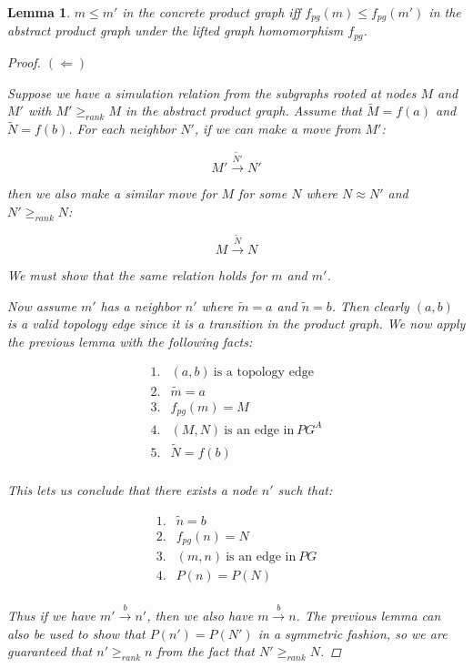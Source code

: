 \documentclass[twocolumn]{sig-alternate-10pt}
\newtheorem{lem}[thm]{Lemma}
\begin{document}
\begin{lem}
  $m \leq m'$ in the concrete product graph iff $f_{pg}(m) \leq f_{pg}(m')$ in the abstract product graph under the lifted graph homomorphism $f_{pg}$.

  \begin{proof}
    $(\Leftarrow)$

    Suppose we have a simulation relation from the subgraphs rooted at nodes $M$ and $M'$ with $M' \geq_{rank} M$ in the abstract product graph. Assume that $\tilde{M} = f(a)$ and $\tilde{N} = f(b)$. For each neighbor $N'$, if we can make a move from $M'$:

    $$M' \overset{\tilde{N'}}{\rightarrow} N'$$

    then we also make a similar move for $M$ for some $N$ where $N \approx N'$ and $N' \geq_{rank} N$:

    $$M \overset{\tilde{N}}{\rightarrow} N$$

    We must show that the same relation holds for $m$ and $m'$. 

    Now assume $m'$ has a neighbor $n'$ where $\tilde{m} = a$ and $\tilde{n} = b$. Then clearly $(a,b)$ is a valid topology edge since it is a transition in the product graph. We now apply the previous lemma with the following facts:

    \[ \begin{array}{ll}
      1. & (a,b) ~\text{is a topology edge} \\
      2. & \tilde{m} = a \\
      3. & f_{pg}(m) = M \\
      4. & (M,N) ~\text{is an edge in}~ PG^A \\
      5. & \tilde{N} = f(b) \\
    \end{array} \]

    This lets us conclude that there exists a node $n'$ such that:

    \[ \begin{array}{ll}
      1. & \tilde{n} = b \\
      2. & f_{pg}(n) = N \\
      3. & (m,n) ~\text{is an edge in}~ PG \\
      4. & P(n) = P(N) \\
    \end{array} \] 

    Thus if we have $m' \overset{b}{\rightarrow} n'$, then we also have $m \overset{b}{\rightarrow} n$. The previous lemma can also be used to show that $P(n') = P(N')$ in a symmetric fashion, so we are guaranteed that $n' \geq_{rank} n$ from the fact that $N' \geq_{rank} N$.


\end{proof}
\end{lem}
\end{document}

